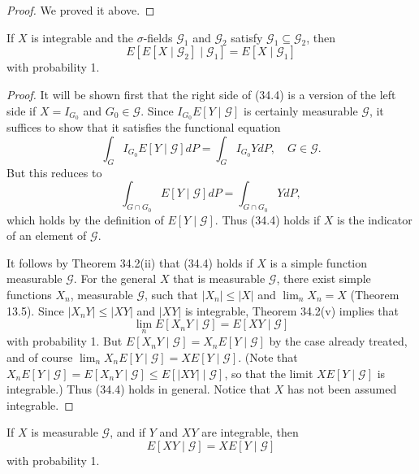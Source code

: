 \begin{proof}
    We proved it above.
\end{proof}

\begin{theorem}
    If \( X \) is integrable and the \(\sigma\)-fields \(\mathcal{G}_1\) and \(\mathcal{G}_2\) satisfy \(\mathcal{G}_1 \subseteq \mathcal{G}_2\), then
\[
E[E[X \mid \mathcal{G}_2] \mid \mathcal{G}_1] = E[X \mid \mathcal{G}_1]
\]
with probability 1.
\end{theorem}



\begin{proof}

It will be shown first that the right side of (34.4) is a version of the left side if \( X = I_{G_0} \) and \( G_0 \in \mathcal{G} \). Since \( I_{G_0} E[Y \mid \mathcal{G}] \) is certainly measurable \(\mathcal{G}\), it suffices to show that it satisfies the functional equation
\[
\int_G I_{G_0} E[Y \mid \mathcal{G}] dP = \int_G I_{G_0} Y dP, \quad G \in \mathcal{G}.
\]
But this reduces to
\[
\int_{G \cap G_0} E[Y \mid \mathcal{G}] dP = \int_{G \cap G_0} Y dP,
\]
which holds by the definition of \( E[Y \mid \mathcal{G}] \). Thus (34.4) holds if \( X \) is the indicator of an element of \(\mathcal{G}\).

It follows by Theorem 34.2(ii) that (34.4) holds if \( X \) is a simple function measurable \(\mathcal{G}\). For the general \( X \) that is measurable \(\mathcal{G}\), there exist simple functions \( X_n \), measurable \(\mathcal{G}\), such that \( |X_n| \leq |X| \) and \( \lim_{n} X_n = X \) (Theorem 13.5). Since \( |X_n Y| \leq |XY| \) and \( |XY| \) is integrable, Theorem 34.2(v) implies that
\[
\lim_{n} E[X_n Y \mid \mathcal{G}] = E[XY \mid \mathcal{G}]
\]
with probability 1. But \( E[X_n Y \mid \mathcal{G}] = X_n E[Y \mid \mathcal{G}] \) by the case already treated, and of course \( \lim_{n} X_n E[Y \mid \mathcal{G}] = X E[Y \mid \mathcal{G}] \). (Note that \( X_n E[Y \mid \mathcal{G}] = E[X_n Y \mid \mathcal{G}] \leq E[|XY| \mid \mathcal{G}] \), so that the limit \( X E[Y \mid \mathcal{G}] \) is integrable.) Thus (34.4) holds in general. Notice that \( X \) has not been assumed integrable.

\end{proof}


\begin{theorem}
    If \( X \) is measurable \(\mathcal{G}\), and if \( Y \) and \( XY \) are integrable, then
    \[
    E[XY \mid \mathcal{G}] = XE[Y \mid \mathcal{G}]
    \]
    with probability 1.

\end{theorem}


